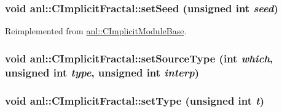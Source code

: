 \label{classanl_1_1CImplicitFractal_a744a3ba1497e1f36c765376193bbb672}
\hypertarget{classanl_1_1CImplicitFractal_ad50523033bd36b13bbc21aaa3def0499}{
\subsubsection[{setSeed}]{\setlength{\rightskip}{0pt plus 5cm}void anl::CImplicitFractal::setSeed (unsigned int {\em seed})}}
\label{classanl_1_1CImplicitFractal_ad50523033bd36b13bbc21aaa3def0499}


Reimplemented from \hyperlink{classanl_1_1CImplicitModuleBase_a12e7dc121de7ff95dd1952af2679867c}{anl::CImplicitModuleBase}.\hypertarget{classanl_1_1CImplicitFractal_a29e4aaa3356b9782aa44388023d46d63}{
\subsubsection[{setSourceType}]{\setlength{\rightskip}{0pt plus 5cm}void anl::CImplicitFractal::setSourceType (int {\em which}, \/  unsigned int {\em type}, \/  unsigned int {\em interp})}}
\label{classanl_1_1CImplicitFractal_a29e4aaa3356b9782aa44388023d46d63}
\hypertarget{classanl_1_1CImplicitFractal_a8c2950c653a22ea6e1604328012dce9d}{
\subsubsection[{setType}]{\setlength{\rightskip}{0pt plus 5cm}void anl::CImplicitFractal::setType (unsigned int {\em t})}}
\label{classanl_1_1CImplicitFractal_a8c2950c653a22ea6e1604328012dce9d}



